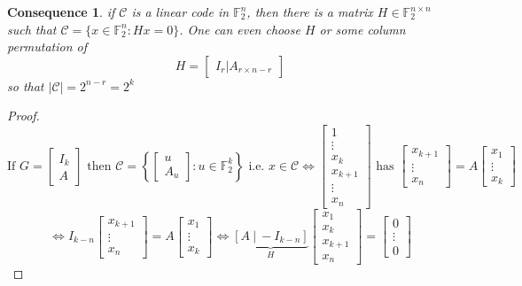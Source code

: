\documentclass[twoside]{article}
\newtheorem{consequence}{Consequence}[section]
\theoremstyle{definition} %
\def\F{\mathbb{F}}
\def\C{\mathcal{C}}
\begin{document}
\begin{consequence}
  if $\C$ is a linear code in $\F_2^n$, then there is a matrix $H \in \F_2^{n\times n}$ such that $\C = \{ x \in \F_2^n : H x = 0 \}$. One can even choose $H$ or some column permutation of
  \[
    H = \begin{bmatrix}
      I_r|A_{r \times n-r}
    \end{bmatrix}
  \]
  so that $|\C| = 2^{n-r} = 2^k$
\end{consequence}


\begin{proof}
  \[
    \text{If } G = \begin{bmatrix}
      I_k\\
      A
    \end{bmatrix} \text{ then } \C = \left\{ \begin{bmatrix}
      u\\ A_u
    \end{bmatrix} : u \in \F_2^k \right\}
    \text{ i.e. } x\in \C \iff \begin{bmatrix}
      1\\ \vdots\\x_k\\x_{k+1}\\ \vdots\\x_n
    \end{bmatrix} \text{ has } \begin{bmatrix}
      x_{k+1}\\ \vdots\\ x_n
    \end{bmatrix} = A \begin{bmatrix}
      x_{1}\\ \vdots\\ x_k
    \end{bmatrix}
  \]
  \[
    \iff I_{k-n} \begin{bmatrix}
      x_{k+1}\\ \vdots\\ x_n
    \end{bmatrix} = A \begin{bmatrix}
      x_{1}\\ \vdots\\ x_k
    \end{bmatrix}
    \iff
    \underbrace{[A~|~-I_{k-n}]}_{H}\begin{bmatrix}
      x_1\\x_k\\x_{k+1}\\x_n
    \end{bmatrix} =
    \begin{bmatrix}
      0\\ \vdots \\ 0
    \end{bmatrix}
  \]
\end{proof}
\end{document}
